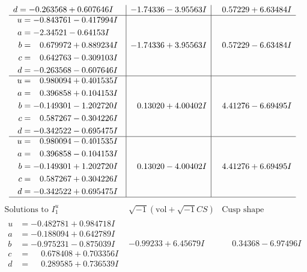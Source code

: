 \documentclass[1p]{elsarticle_modified}
\theoremstyle{definition}
\newcommand{\I}{\sqrt{-1}}
\begin{document}
$$\begin{array}{c|c|c}
\begin{aligned}
d &= -0.263568 + 0.607646 I\end{aligned}
 & -1.74336 - 3.95563 I & \phantom{-}0.57229 + 6.63484 I \\ \hline\begin{aligned}
u &= -0.843761 - 0.417994 I \\
a &= -2.34521 - 0.64153 I \\
b &= \phantom{-}0.679972 + 0.889234 I \\
c &= \phantom{-}0.642763 - 0.309103 I \\
d &= -0.263568 - 0.607646 I\end{aligned}
 & -1.74336 + 3.95563 I & \phantom{-}0.57229 - 6.63484 I \\ \hline\begin{aligned}
u &= \phantom{-}0.980094 + 0.401535 I \\
a &= \phantom{-}0.396858 + 0.104153 I \\
b &= -0.149301 - 1.202720 I \\
c &= \phantom{-}0.587267 - 0.304226 I \\
d &= -0.342522 - 0.695475 I\end{aligned}
 & \phantom{-}0.13020 + 4.00402 I & \phantom{-}4.41276 - 6.69495 I \\ \hline\begin{aligned}
u &= \phantom{-}0.980094 - 0.401535 I \\
a &= \phantom{-}0.396858 - 0.104153 I \\
b &= -0.149301 + 1.202720 I \\
c &= \phantom{-}0.587267 + 0.304226 I \\
d &= -0.342522 + 0.695475 I\end{aligned}
 & \phantom{-}0.13020 - 4.00402 I & \phantom{-}4.41276 + 6.69495 I\\
 \hline 
 \end{array}$$\newpage$$\begin{array}{c|c|c}  
\text{Solutions to }I^u_{1}& \I (\text{vol} + \sqrt{-1}CS) & \text{Cusp shape}\\
 \hline 
\begin{aligned}
u &= -0.482781 + 0.984718 I \\
a &= -0.188094 + 0.642789 I \\
b &= -0.975231 - 0.875039 I \\
c &= \phantom{-}0.678408 + 0.703356 I \\
d &= \phantom{-}0.289585 + 0.736539 I\end{aligned}
 & -0.99233 + 6.45679 I & \phantom{-}0.34368 - 6.97496 I \\ \hline\begin{aligned}

\end{aligned}
\end{array}$$
\end{document}
